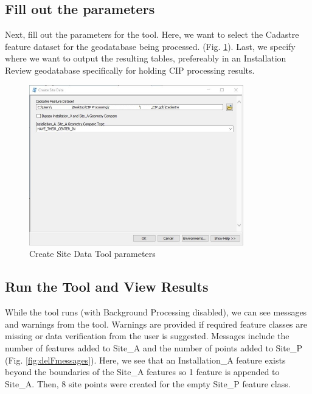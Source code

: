 \documentclass[openany]{book}
\theoremstyle{definition}
\theoremstyle{definition}
\theoremstyle{definition}
\theoremstyle{remark}
\begin{document}
\subsection{Fill out the parameters}\label{fill-out-the-parameters}

Next, fill out the parameters for the tool. Here, we want to select the
Cadastre feature dataset for the geodatabase being processed. (Fig.
\ref{fig:csdparams}). Last, we specify where we want to output the
resulting tables, prefereably in an Installation Review geodatabase
specifically for holding CIP processing results.\\

\begin{figure}[H]

{\centering \includegraphics[width=3.67in,]{figures/csd-params} 

}

\caption{Create Site Data Tool parameters}\label{fig:csdparams}
\end{figure}

\subsection{Run the Tool and View
Results}\label{run-the-tool-and-view-results}

While the tool runs (with Background Processing disabled), we can see
messages and warnings from the tool. Warnings are provided if required
feature classes are missing or data verification from the user is
suggested. Messages include the number of features added to Site\_A and
the number of points added to Site\_P (Fig. \ref{fig:delFmessages}).
Here, we see that an Installation\_A feature exists beyond the
boundaries of the Site\_A features so 1 feature is appended to Site\_A.
Then, 8 site points were created for the empty Site\_P feature class.
\end{document}
